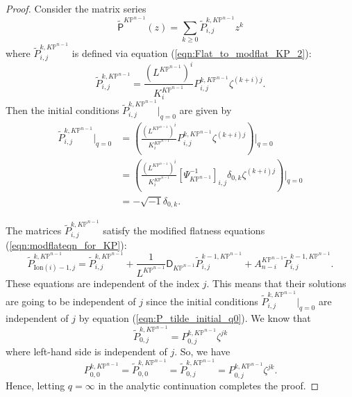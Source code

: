 \documentclass[12pt]{amsart}
\numberwithin{equation}{section}
\newcommand{\KP}{K\mathbb{P}}
\begin{document}
\begin{proof}
Consider the matrix series 
\begin{equation*}
\widetilde{\mathsf{P}}^{\KP^{n-1}}(z)=\sum_{k\geq{0}}\widetilde{P}_{i,j}^{k,\KP^{n-1}}z^k
\end{equation*}
where $\widetilde{P}_{i,j}^{k,\KP^{n-1}}$ is defined via equation (\ref{eqn:Flat_to_modflat_KP_2}):
\begin{equation*}
\widetilde{P}_{i,j}^{k,\KP^{n-1}}=\frac{(L^{\KP^{n-1}})^i}{K^{\KP^{n-1}}_i}P_{i,j}^{k,\KP^{n-1}}\zeta^{(k+i)j}.
\end{equation*}
Then the initial conditions $\widetilde{P}_{i,j}^{k,\KP^{n-1}}\big\vert_{q=0}$ are given by
\begin{equation}\label{eqn:P_tilde_initial_q0}
\begin{split}
\widetilde{P}_{i,j}^{k,\KP^{n-1}}\big\vert_{q=0}
&=\left(\frac{(L^{\KP^{n-1}})^i}{K^{\KP^{n-1}}_i}P_{i,j}^{k,\KP^{n-1}}\zeta^{(k+i)j}\right)\Bigg\vert_{q=0}\\
&=\left(\frac{(L^{\KP^{n-1}})^i}{K^{\KP^{n-1}}_i}\left[\Psi^{-1}_{\KP^{n-1}}\right]_{i,j}\delta_{0,k}\zeta^{(k+i)j}\right)\Bigg\vert_{q=0}\\
&=-\sqrt{-1}\delta_{0,k}.
\end{split}
\end{equation}

The matrices $\widetilde{P}_{i,j}^{k,\KP^{n-1}}$ satisfy the modified flatness equations (\ref{eqn:modflateqn_for_KP}):
    \begin{equation*}
    \widetilde{P}_{\mathrm{Ion}(i)-1,j}^{k,\KP^{n-1}}=\widetilde{P}_{i,j}^{k,\KP^{n-1}}+\frac{1}{L^{\KP^{n-1}}}\mathsf{D}_{\KP^{n-1}}\widetilde{P}_{i,j}^{k-1,\KP^{n-1}}+A^{\KP^{n-1}}_{n-i}\widetilde{P}_{i,j}^{k-1,\KP^{n-1}}.
    \end{equation*}
These equations are independent of the index $j$. This means that their solutions are going to be independent of $j$ since the initial conditions $\widetilde{P}_{i,j}^{k,\KP^{n-1}}\big\vert_{q=0}$ are independent of $j$ by equation (\ref{eqn:P_tilde_initial_q0}). We know that
\begin{equation*}
\widetilde{P}_{0,j}^{k,\KP^{n-1}}=P_{0,j}^{k,\KP^{n-1}}\zeta^{jk}
\end{equation*}
where left-hand side is independent of $j$. So, we have
\begin{equation*}
P_{0,0}^{k,\KP^{n-1}}=\widetilde{P}_{0,0}^{k,\KP^{n-1}}=\widetilde{P}_{0,j}^{k,\KP^{n-1}}=P_{0,j}^{k,\KP^{n-1}}\zeta^{jk}.
\end{equation*}
Hence, letting $q=\infty$ in the analytic continuation completes the proof.
\end{proof}
\end{document}
